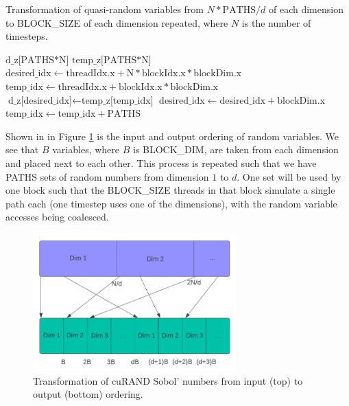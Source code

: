 \begin{algorithm}[hbt!]
\caption{Transformation of quasi-random variables from $N*\text{PATHS}/d$ of each dimension to BLOCK_SIZE of each dimension repeated, where $N$ is the number of timesteps.}\label{alg:QuasiRandomNumbersTransformation}
\begin{algorithmic}[1]
\State $\text{d_z[PATHS*N]}$  
\State $\text{temp_z[PATHS*N]}$ 
\State $\text{desired_idx} \gets \text{threadIdx.x} + \text{N} * \text{blockIdx.x} * \text{blockDim.x}$
\State $\text{temp_idx} \gets \text{threadIdx.x} + \text{blockIdx.x} * \text{blockDim.x}$
    \State $\text{d_z[desired_idx]} \gets \text{temp_z[temp_idx]}$
    \State $\text{desired_idx} \gets \text{desired_idx} + \text{blockDim.x}$
    \State $\text{temp_idx} \gets \text{temp_idx} + \text{PATHS}$
\EndFor
\end{algorithmic}
\end{algorithm}

Shown in in Figure \ref{fig:QuasiVariableTransformation} is the input and output ordering of random variables. We see that $B$ variables, where $B$ is BLOCK\_DIM, are taken from each dimension and placed next to each other. This process is repeated such that we have PATHS sets of random numbers from dimension $1$ to $d$. One set will be used by one block such that the BLOCK\_SIZE threads in that block simulate a single path each (one timestep uses one of the dimensions), with the random variable accesses being coalesced.

\begin{figure}[h]
    \centering
    \includegraphics[width=0.7\textwidth]{figures/quasi ordering transform.pdf}
    \caption{Transformation of cuRAND Sobol' numbers from input (top) to output (bottom) ordering.}
    \label{fig:QuasiVariableTransformation}
\end{figure}

